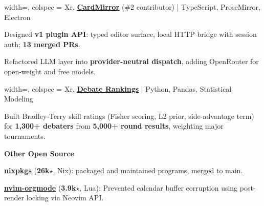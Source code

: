 \documentclass[10pt]{article}
\begin{document}
\vspace{0.5em}

\begin{tblr}{
    width=\textwidth,
    colspec = {Xr},
  }
  \href{https://github.com/ant981228/cardmirror}{{\bfseries \ul{CardMirror}}} (\#2 contributor) | TypeScript, ProseMirror, Electron
\end{tblr}
\vspace{-0.5em}
\begin{compactitem}
\item Designed \textbf{v1 plugin API}: typed editor surface,
    local HTTP bridge with session auth; \textbf{13 merged PRs}.

\item Refactored LLM layer into \textbf{provider-neutral dispatch},
    adding OpenRouter for open-weight and free models.
\end{compactitem}

\vspace{0.5em}

\begin{tblr}{
    width=\textwidth,
    colspec = {Xr},
  }
  \href{https://github.com/shreerammodi/debate-rankings}{{\bfseries \ul{Debate Rankings}}} | Python, Pandas, Statistical Modeling
\end{tblr}
\vspace{-0.5em}
\begin{compactitem}
\item Built Bradley-Terry skill ratings (Fisher scoring, L2 prior,
    side-advantage term) for \textbf{1,300+ debaters} from
    \textbf{5,000+ round results}, weighting major tournaments.
\end{compactitem}

\vspace{0.5em}

{\bfseries Other Open Source}

\begin{compactitem}
\item \href{https://github.com/NixOS/nixpkgs/}{\textbf{\ul{nixpkgs}}}
    (\textbf{26k}$\star$, Nix): packaged and maintained programs,
    merged to main.

\item
    \href{https://github.com/nvim-orgmode/}{\textbf{\ul{nvim-orgmode}}}
    (\textbf{3.9k}$\star$, Lua): Prevented calendar buffer corruption
    using post-render locking via Neovim API.
\end{compactitem}

\vspace{0.5em}
\end{document}
